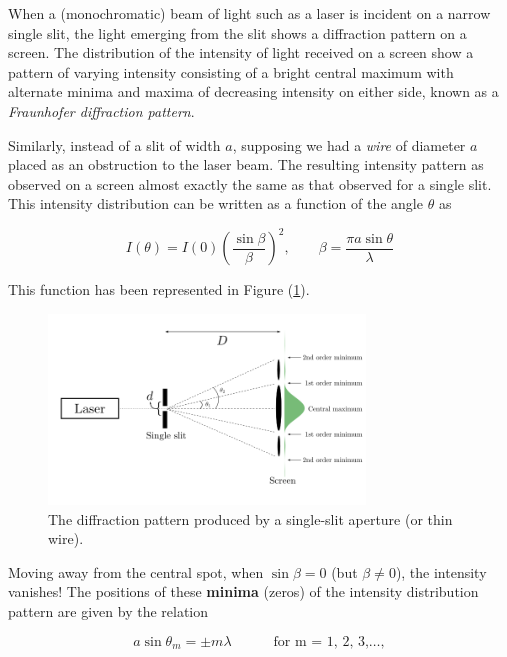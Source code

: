 \begin{refsection}
When a (monochromatic) beam of light such as a laser is incident on a narrow single slit, the light emerging from the slit shows a diffraction pattern on a screen. The distribution of the intensity of light received on a screen show a pattern of varying intensity consisting of a bright central maximum with alternate minima and maxima of decreasing intensity on either side, known as a \textit{Fraunhofer diffraction pattern}.

Similarly, instead of a slit of width $a$, supposing we had a \textit{wire} of diameter $a$ placed as an obstruction to the laser beam. The resulting intensity pattern as observed on a screen almost exactly the same as that observed for a single slit. This intensity distribution can be written as a function of the angle $\theta$ as

\begin{equation*}
    I(\theta) = I(0) \left( \frac{\sin \beta}{\beta} \right)^2, \quad \quad  \beta = \frac{\pi a \sin \theta}{\lambda}
\end{equation*}

This function has been represented in Figure (\ref{fig:singleslit}).

\begin{figure}[!htb]
    \centering
    \includegraphics[width=0.75\textwidth]{figs/singleslit.png}
    \caption{The diffraction pattern produced by a single-slit aperture (or thin wire).}
    \label{fig:singleslit}
\end{figure}


Moving away from the central spot, when $\sin\beta=0$ (but $\beta \neq 0$), the intensity vanishes! The positions of these \textbf{minima} (zeros) of the intensity distribution pattern are given by the relation 

\begin{equation}
   a \sin{\theta_m} = \pm m \lambda  \quad\quad\quad \text{for    m  = 1, 2, 3,}\hdots,
   \label{singleslit}
\end{equation}


\end{refsection}
